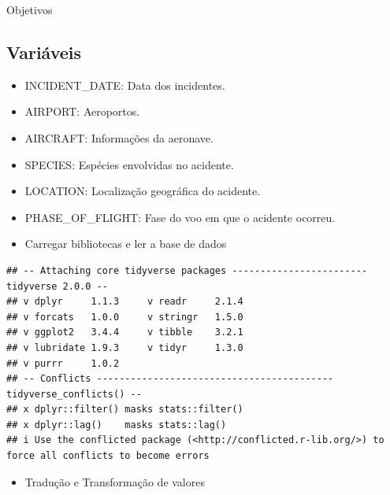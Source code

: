 \documentclass[
]{article}
\providecommand{\tightlist}{%
  \setlength{\itemsep}{0pt}\setlength{\parskip}{0pt}}
\begin{document}
\Large    Objetivos

\newpage

\subsection{Variáveis} 
\label{sec:Variáveis}

\vspace{1.5cm}
\large
\begin{itemize}
    \item INCIDENT_DATE: Data dos incidentes.
    \item AIRPORT: Aeroportos.
    \item AIRCRAFT: Informações da aeronave.
    \item SPECIES: Espécies envolvidas no acidente.
    \item LOCATION: Localização geográfica do acidente.
    \item PHASE_OF_FLIGHT: Fase do voo em que o acidente ocorreu. 
    
\end{itemize}

\small

\begin{itemize}
\tightlist
\item
  Carregar bibliotecas e ler a base de dados
\end{itemize}

\begin{verbatim}
## -- Attaching core tidyverse packages ------------------------ tidyverse 2.0.0 --
## v dplyr     1.1.3     v readr     2.1.4
## v forcats   1.0.0     v stringr   1.5.0
## v ggplot2   3.4.4     v tibble    3.2.1
## v lubridate 1.9.3     v tidyr     1.3.0
## v purrr     1.0.2     
## -- Conflicts ------------------------------------------ tidyverse_conflicts() --
## x dplyr::filter() masks stats::filter()
## x dplyr::lag()    masks stats::lag()
## i Use the conflicted package (<http://conflicted.r-lib.org/>) to force all conflicts to become errors
\end{verbatim}

\begin{itemize}
\tightlist
\item
  Tradução e Transformação de valores
\end{itemize}
\end{document}
